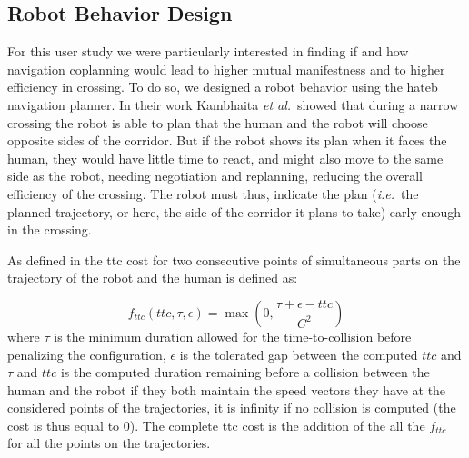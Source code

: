 \documentclass[a4paper,11pt,twoside]{StyleThese}
\begin{document}
\subsection{Robot Behavior Design}
For this user study we were particularly interested in finding if and how navigation coplanning would lead to higher mutual manifestness and to higher efficiency in crossing.
To do so, we designed a robot behavior using the \acrshort{hateb} navigation planner.
In their work Kambhaita \textit{et al.}\ showed that during a narrow crossing the robot is able to plan that the human and the robot will choose opposite sides of the corridor. But if the robot shows its plan when it faces the human, they would have little time to react, and might also move to the same side as the robot, needing negotiation and replanning, reducing the overall efficiency of the crossing. The robot must thus, indicate the plan (\textit{i.e.}~the planned trajectory, or here, the side of the corridor it plans to take) early enough in the crossing.

As defined in \cite{khambhaita_viewing_2017} the \acrshort{ttc} cost for two consecutive points of simultaneous parts on the trajectory of the robot and the human is defined as:

\begin{equation}\label{eq:ttc}
f_{ttc}(ttc, \tau, \epsilon) = \max(0, \frac{\tau + \epsilon - ttc}{C^2})
\end{equation}
where $\tau$ is the minimum duration allowed for the time-to-collision before penalizing the configuration, $\epsilon$ is the tolerated gap between the computed $ttc$ and $\tau$ and $ttc$ is the computed duration remaining before a collision between the human and the robot if they both maintain the speed vectors they have at the considered points of the trajectories, it is infinity if no collision is computed (the cost is thus equal to 0). The complete \acrshort{ttc} cost is the addition of the all the $f_{ttc}$ for all the points on the trajectories.
\end{document}
